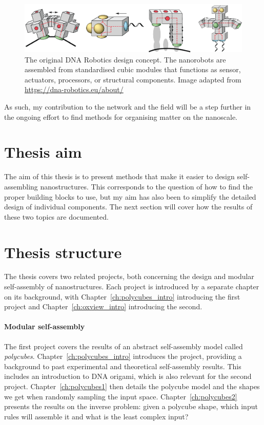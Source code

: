 \begin{figure}
    \centering\includegraphics[width=\textwidth]{figures/dnaRoboticsHeader.png} 
    \caption{The original DNA Robotics design concept. The nanorobots are assembled from standardised cubic modules that functions as sensor, actuators, processors, or structural components. Image adapted from \url{https://dna-robotics.eu/about/}}
    \label{fig:dnaRoboticsHeader}
\end{figure}

As such, my contribution to the network and the field will be a step further in the ongoing effort to find methods for organising matter on the nanoscale.

\section{Thesis aim}
The aim of this thesis is to present methods that make it easier to design self-assembling nanostructures. This corresponds to the question of how to find the proper building blocks to use, but my aim has also been to simplify the detailed design of individual components. The next section will cover how the results of these two topics are documented.


\section{Thesis structure}
The thesis covers two related projects, both concerning the design and modular self-assembly of nanostructures. Each project is introduced by a separate chapter on its background, with Chapter~\ref{ch:polycubes_intro} introducing the first project and Chapter~\ref{ch:oxview_intro} introducing the second.

\paragraph{Modular self-assembly}
The first project covers the results of an abstract self-assembly model called \emph{polycubes}. Chapter~\ref{ch:polycubes_intro} introduces the project, providing a background to past experimental and theoretical self-assembly results. This includes an introduction to DNA origami, which is also relevant for the second project. Chapter~\ref{ch:polycubes1} then details the polycube model and the shapes we get when randomly sampling the input space. Chapter~\ref{ch:polycubes2} presents the results on the inverse problem: given a polycube shape, which input rules will assemble it and what is the least complex input?

